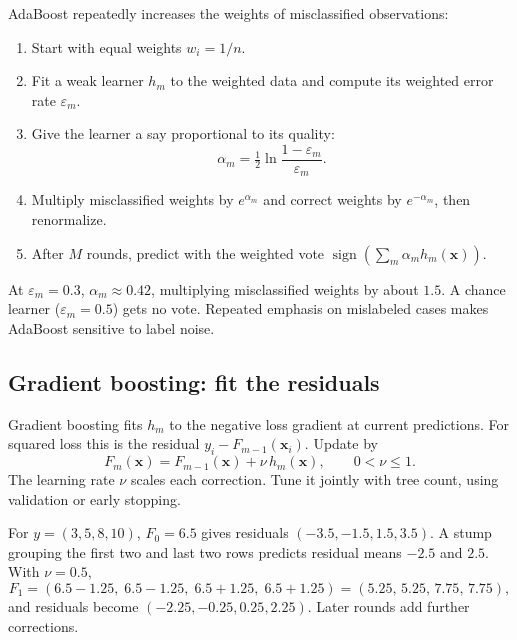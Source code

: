 AdaBoost repeatedly increases the weights of misclassified observations:

\begin{enumerate}
  \item Start with equal weights $w_i=1/n$.
  \item Fit a weak learner $h_m$ to the weighted data and compute its weighted error rate $\varepsilon_m$.
  \item Give the learner a say proportional to its quality:
  \[
    \alpha_m=\tfrac{1}{2}\ln\frac{1-\varepsilon_m}{\varepsilon_m}.
  \]
  \item Multiply misclassified weights by $e^{\alpha_m}$ and correct weights by $e^{-\alpha_m}$, then renormalize.
  \item After $M$ rounds, predict with the weighted vote $\operatorname{sign}\!\left(\sum_m\alpha_m h_m(\bm{x})\right)$.
\end{enumerate}

At $\varepsilon_m=0.3$, $\alpha_m\approx0.42$, multiplying misclassified weights by about $1.5$. A chance learner ($\varepsilon_m=0.5$) gets no vote. Repeated emphasis on mislabeled cases makes AdaBoost sensitive to label noise.

\subsection{Gradient boosting: fit the residuals}
\label{sec:gradient-boosting}

Gradient boosting fits $h_m$ to the negative loss gradient at current predictions. For squared loss this is the residual $y_i-F_{m-1}(\bm x_i)$. Update by
\[
  F_m(\bm{x})
  =F_{m-1}(\bm{x})+\nu\,h_m(\bm{x}),
  \qquad 0<\nu\leq 1.
\]
The learning rate $\nu$ scales each correction. Tune it jointly with tree count, using validation or early stopping.

\begin{workedexample}
For $y=(3,5,8,10)$, $F_0=6.5$ gives residuals $(-3.5,-1.5,1.5,3.5)$. A stump grouping the first two and last two rows predicts residual means $-2.5$ and $2.5$. With $\nu=0.5$,
\[
  F_1=(6.5-1.25,\;6.5-1.25,\;6.5+1.25,\;6.5+1.25)
  =(5.25,\,5.25,\,7.75,\,7.75),
\]
and residuals become $(-2.25,-0.25,0.25,2.25)$. Later rounds add further corrections.
\end{workedexample}

